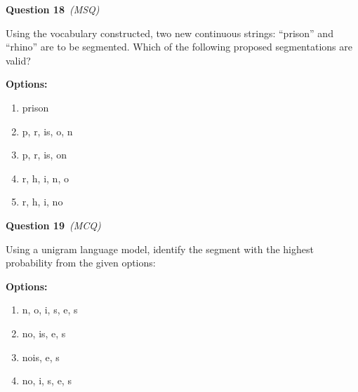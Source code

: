 \documentclass[11pt]{article}
\newcommand{\q}[2]{\vspace{0.5em}\noindent\textbf{Question #1}\if\relax\detokenize{#2}\relax\else\ \textit{(#2)}\fi\par}
\newcommand{\opts}{\textbf{Options:}}
\begin{document}
\q{18}{MSQ}
Using the vocabulary constructed, two new continuous strings: ``prison'' and ``rhino'' are to be segmented. Which of the following proposed segmentations are valid?

\opts
\begin{enumerate}[label=(\alph*)]
\item prison
\item p, r, is, o, n
\item p, r, is, on
\item r, h, i, n, o
\item r, h, i, no
\end{enumerate}

\q{19}{MCQ}
Using a unigram language model, identify the segment with the highest probability from the given options:

\opts
\begin{enumerate}[label=(\alph*)]
\item n, o, i, s, e, s
\item no, is, e, s
\item nois, e, s
\item no, i, s, e, s
\end{enumerate}
\end{document}
